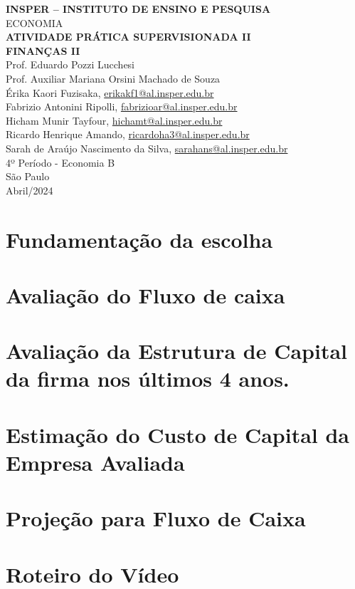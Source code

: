 \documentclass[a4paper,12pt]{article}[abntex2]
\begin{document}
\begin{titlepage}
    \centering
    \vspace*{1cm}
    \Large\textbf{INSPER – INSTITUTO DE ENSINO E PESQUISA}\\
    \Large ECONOMIA\\
    \vspace{1.5cm}
    \Large\textbf{ATIVIDADE PRÁTICA SUPERVISIONADA II}\\
    \textbf{FINANÇAS II}\\
    \vspace{1.5cm}
    Prof.  Eduardo Pozzi Lucchesi\\
    Prof. Auxiliar Mariana Orsini Machado de Souza \\
    \vfill
    \normalsize
    Érika Kaori Fuzisaka, \href{mailto:erikakf1@al.insper.edu.br}{erikakf1@al.insper.edu.br}\\
    Fabrizio Antonini Ripolli, \href{mailto:fabrizioar@al.insper.edu.br}{fabrizioar@al.insper.edu.br}\\
    Hicham Munir Tayfour, \href{mailto:hichamt@al.insper.edu.br}{hichamt@al.insper.edu.br}\\
    Ricardo Henrique Amando, \href{mailto:ricardoha3@al.insper.edu.br}{ricardoha3@al.insper.edu.br}\\
    Sarah de Araújo Nascimento da Silva, \href{mailto:sarahans@al.insper.edu.br}{sarahans@al.insper.edu.br}\\
    4º Período - Economia B\\
    \vfill
    São Paulo\\
    Abril/2024
\end{titlepage}

\tableofcontents
\thispagestyle{empty} %
\newpage
\setcounter{page}{1} %

\justify
\onehalfspacing

\pagestyle{fancy}
\fancyhf{}
\rhead{\thepage}

\section{\textbf{Fundamentação da escolha}}

\section{\textbf{Avaliação do Fluxo de caixa }}

\section{\textbf{Avaliação da Estrutura de Capital da firma nos últimos 4 anos.}}

\section{\textbf{Estimação do Custo de Capital da Empresa Avaliada}}

\section{\textbf{Projeção para Fluxo de Caixa}}

\section{\textbf{Roteiro do Vídeo}}
\end{document}

